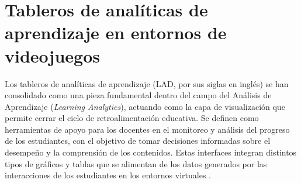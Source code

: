 \begin{table}[H]
	\centering
	\footnotesize
	\setlength{\tabcolsep}{3pt}
	\renewcommand{\arraystretch}{0.92}
	\caption{Comparación de videojuegos educativos según criterios pedagógicos y de gestión docente.}
	\label{tab:comparacion_videojuegos}
\end{table}

\section{Tableros de analíticas de aprendizaje en entornos de videojuegos}

Los tableros de analíticas de aprendizaje (LAD, por sus siglas en inglés) se han consolidado como una pieza fundamental dentro del campo del Análisis de Aprendizaje (\textit{Learning Analytics}), actuando como la capa de visualización que permite cerrar el ciclo de retroalimentación educativa. Se definen como herramientas de apoyo para los docentes en el monitoreo y análisis del progreso de los estudiantes, con el objetivo de tomar decisiones informadas sobre el desempeño y la comprensión de los contenidos. Estas interfaces integran distintos tipos de gráficos y tablas que se alimentan de los datos generados por las interacciones de los estudiantes en los entornos virtuales \cite{long2011penetrating, rahimi2021learning}.

